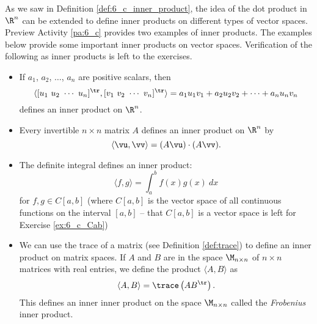 








 

As we saw in Definition \ref{def:6_c_inner_product}, the idea of the dot product in $\R^n$ can be extended to define inner products on different types of vector spaces. Preview Activity \ref{pa:6_c} provides two examples of inner products. The examples below provide some important inner products on vector spaces. Verification of the following as inner products is left to the exercises. 

\begin{itemize}
\item If $a_1$, $a_2$, $\ldots$, $a_n$ are positive scalars, then 
\[\langle [u_1 \ u_2 \ \cdots \ u_n]^{\tr},  [v_1 \ v_2 \ \cdots \ v_n]^{\tr} \rangle = a_1u_1v_1+a_2u_2v_2+ \cdots + a_nu_nv_n\]
 defines an inner product on $\R^n$. 
\item Every invertible $n \times n$ matrix $A$ defines an inner product on $\R^n$ by  
\[\langle \vu, \vv \rangle = (A\vu) \cdot (A\vv).\]
\item The definite integral defines an inner product: 
\[\langle f, g \rangle = \int_a^b f(x)g(x) \ dx\]
for $f,g \in C[a,b]$ (where $C[a,b]$ is the vector space of all continuous functions on the interval $[a,b]$ -- that $C[a,b]$ is a vector space is left for Exercise \ref{ex:6_c_Cab})
\item We can use the trace of a matrix (see Definition \ref{def:trace}) to define an inner product on matrix spaces. If $A$ and $B$ are in the space $\M_{n \times n}$ of $n \times n$ matrices with real entries, we define the product $\langle A , B \rangle$ as 
\[\langle A, B \rangle = \trace\left(AB^{\tr}\right).\]
This defines an inner inner product on the space $\M_{n \times n}$ called the \emph{Frobenius} inner product. 
\end{itemize}

